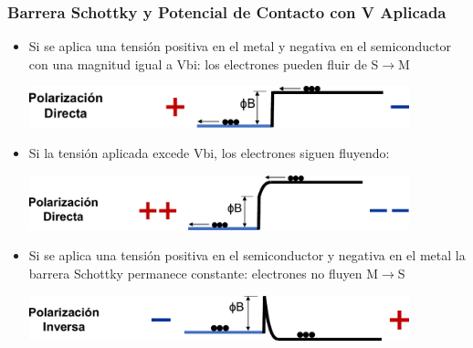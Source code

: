 \documentclass[10pt,t,aspectratio=169]{beamer}
\begin{document}
\begin{frame}[t]
    \frametitle{Barrera Schottky y Potencial de Contacto con V Aplicada}

    \begin{itemize}
        \item Si se aplica una tensión positiva en el metal y negativa en el semiconductor con una magnitud igual a Vbi: los electrones pueden fluir de S$\rightarrow$M
        
        \centering
        \includegraphics[width=11cm]{./figures/contacto-MS-9a.pdf}

        \flushleft
        \item Si la tensión aplicada excede Vbi, los electrones siguen fluyendo:

        \centering
        \includegraphics[width=11cm]{./figures/contacto-MS-9b.pdf}

        \flushleft
        \item Si se aplica una tensión positiva en el semiconductor y negativa en el metal la barrera Schottky permanece constante: electrones no fluyen M$\rightarrow$S

        \centering
        \includegraphics[width=11cm]{./figures/contacto-MS-9c.pdf}
    \end{itemize}
\end{frame}
\end{document}

